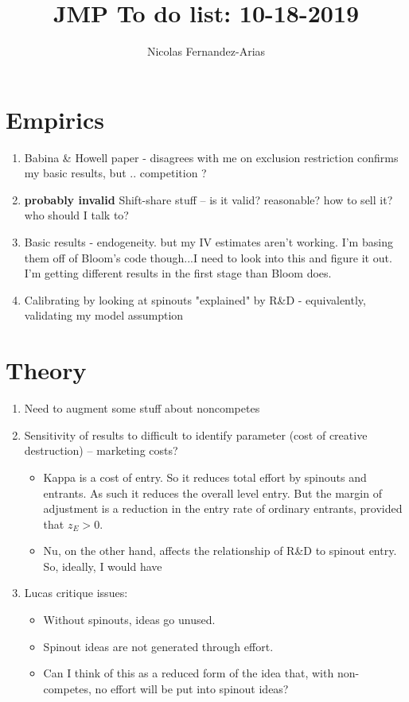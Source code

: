 \documentclass[11pt,english]{article}
\theoremstyle{remark}
\begin{document}
	
	\title{JMP To do list: 10-18-2019}
	\author{Nicolas Fernandez-Arias}
	\maketitle

\section{Empirics}

\begin{enumerate}
	\item Babina \& Howell paper - disagrees with me on exclusion restriction confirms my basic results, but .. competition ?
	\item \textbf{probably invalid} Shift-share stuff -- is it valid? reasonable? how to sell it? who should I talk to?
	\item Basic results - endogeneity. but my IV estimates aren't working. I'm basing them off of Bloom's code though...I need to look into this and figure it out. I'm getting different results in the first stage than Bloom does.
	\item Calibrating by looking at spinouts "explained" by R\&D -  equivalently, validating my model assumption
\end{enumerate}


\section{Theory}

\begin{enumerate}
	\item Need to augment some stuff about noncompetes 
	\item Sensitivity of results to difficult to identify parameter (cost of creative destruction) -- marketing costs?
	\begin{itemize}
		\item Kappa is a cost of entry. So it reduces total effort by spinouts and entrants. As such it reduces the overall level entry. But the margin of adjustment is a reduction in the entry rate of ordinary entrants, provided that $z_E > 0$. 
		\item Nu, on the other hand, affects the relationship of R\&D to spinout entry. So, ideally, I would have 
	\end{itemize}
	\item Lucas critique issues:
	\begin{itemize}
		\item Without spinouts, ideas go unused.
		\item Spinout ideas are not generated through effort. 
		\item Can I think of this as a reduced form of the idea that, with non-competes, no effort will be put into spinout ideas? 
	\end{itemize}
\end{enumerate}
 
\end{document}
